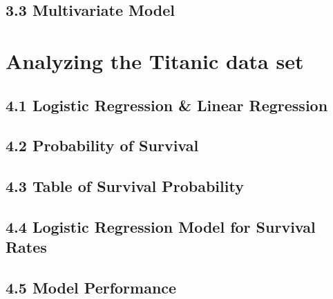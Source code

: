 \documentclass[12pt]{article}
\begin{document}
	\subsection{3.3 Multivariate Model}
	\answer{}
	
	\section{Analyzing the Titanic data set}
	\subsection{4.1 Logistic Regression \& Linear Regression}
	\subsection{4.2 Probability of Survival}
	\subsection{4.3 Table of Survival Probability}
	\subsection{4.4 Logistic Regression Model for Survival Rates}
	\subsection{4.5 Model Performance}
	
	
\end{document}
